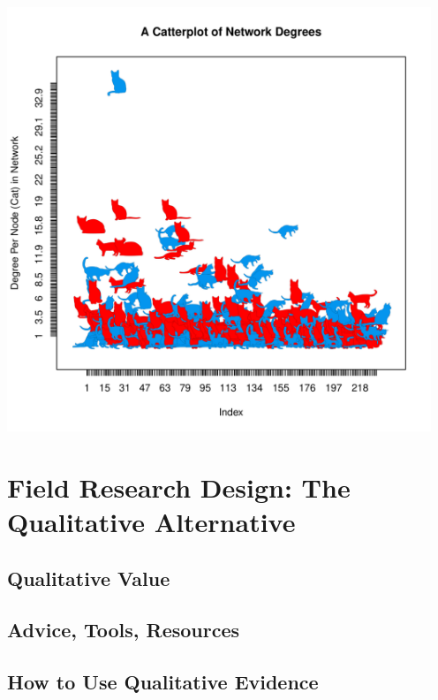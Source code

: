 \documentclass[12pt]{article}\usepackage[]{graphicx}\usepackage[]{color}
\newenvironment{knitrout}{}{} %
\begin{document}
\begin{flushleft}
\begin{center}
\begin{knitrout}
\includegraphics[width=5in]{figure/what-1} 

\end{knitrout}
\end{center}



\clearpage
\section{Field Research Design: The Qualitative Alternative}

\subsection{Qualitative Value}

\subsection{Advice, Tools, Resources}

\subsection{How to Use Qualitative Evidence}





\clearpage

\end{flushleft}
\end{document}
